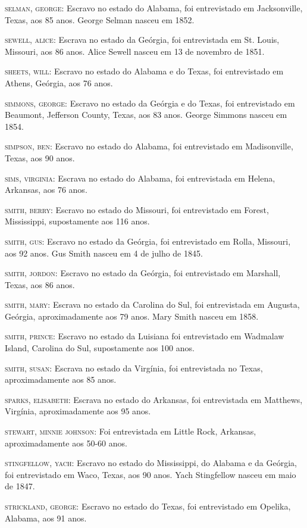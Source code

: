 \begin{Parskip}
\textsc{selman, george:} Escravo no estado do Alabama, foi entrevistado
em Jacksonville, Texas, aos 85 anos. George Selman nasceu em 1852.

\textsc{sewell, alice:} Escrava no estado da Geórgia, foi entrevistada
em St. Louis, Missouri, aos 86 anos. Alice Sewell nasceu em 13 de
novembro de 1851.

\textsc{sheets, will:} Escravo no estado do Alabama e do Texas, foi
entrevistado em Athens, Geórgia, aos 76 anos.

\textsc{simmons, george:} Escravo no estado da Geórgia e do Texas, foi
entrevistado em Beaumont, Jefferson County, Texas, aos 83 anos. George
Simmons nasceu em 1854.

\textsc{simpson, ben:} Escravo no estado do Alabama, foi entrevistado em
Madisonville, Texas, aos 90 anos.

\textsc{sims, virginia:} Escrava no estado do Alabama, foi entrevistada
em Helena, Arkansas, aos 76 anos.

\textsc{smith, berry:} Escravo no estado do Missouri, foi entrevistado
em Forest, Mississippi, supostamente aos 116 anos.

\textsc{smith, gus:} Escravo no estado da Geórgia, foi entrevistado em
Rolla, Missouri, aos 92 anos. Gus Smith nasceu em 4 de julho de 1845.

\textsc{smith, jordon:} Escravo no estado da Geórgia, foi entrevistado
em Marshall, Texas, aos 86 anos.

\textsc{smith, mary:} Escrava no estado da Carolina do Sul, foi
entrevistada em Augusta, Geórgia, aproximadamente aos 79 anos. Mary
Smith nasceu em 1858.

\textsc{smith, prince:} Escravo no estado da Luisiana foi entrevistado
em Wadmalaw Island, Carolina do Sul, supostamente aos 100 anos.

\textsc{smith, susan:} Escrava no estado da Virgínia, foi entrevistada
no Texas, aproximadamente aos 85 anos.

\textsc{sparks, elisabeth:} Escrava no estado do Arkansas, foi
entrevistada em Matthews, Virgínia, aproximadamente aos 95 anos.

\textsc{stewart, minnie johnson:} Foi entrevistada em Little Rock,
Arkansas, aproximadamente aos 50-60 anos.

\textsc{stingfellow, yach:} Escravo no estado do Mississippi, do Alabama
e da Geórgia, foi entrevistado em Waco, Texas, aos 90 anos. Yach
Stingfellow nasceu em maio de 1847.

\textsc{strickland, george:} Escravo no estado do Texas, foi
entrevistado em Opelika, Alabama, aos 91 anos.


\end{Parskip}
